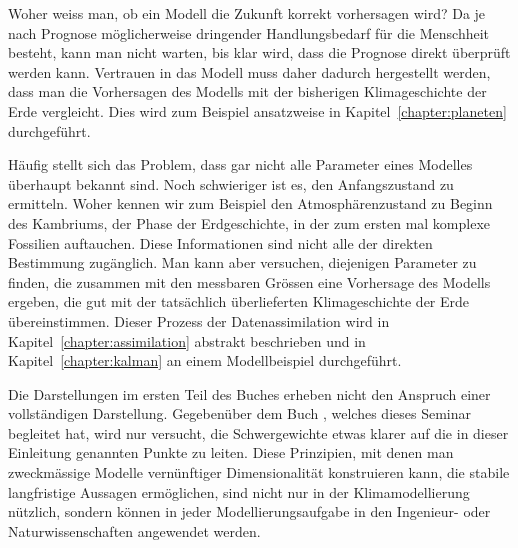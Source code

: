 Woher weiss man, ob ein Modell die Zukunft korrekt vorhersagen wird?
Da je nach Prognose möglicherweise dringender Handlungsbedarf für die
Menschheit besteht, kann man nicht warten, bis klar wird, dass die
Prognose direkt überprüft werden kann.
Vertrauen in das Modell muss daher dadurch hergestellt werden, dass
man die Vorhersagen des Modells mit der bisherigen Klimageschichte
der Erde vergleicht.
Dies wird zum Beispiel ansatzweise in Kapitel~\ref{chapter:planeten}
durchgeführt.

Häufig stellt sich das Problem, dass gar nicht alle Parameter eines
Modelles überhaupt bekannt sind.
Noch schwieriger ist es, den Anfangszustand zu ermitteln.
Woher kennen wir zum Beispiel den Atmosphärenzustand zu Beginn des
Kambriums, der Phase der Erdgeschichte, in der zum ersten mal komplexe
Fossilien auftauchen.
Diese Informationen sind nicht alle der direkten Bestimmung
zugänglich.
Man kann aber versuchen, diejenigen Parameter zu finden, die zusammen
mit den messbaren Grössen eine Vorhersage des Modells ergeben, die
gut mit der tatsächlich überlieferten Klimageschichte der Erde 
übereinstimmen.
Dieser Prozess der Datenassimilation wird in
Kapitel~\ref{chapter:assimilation} abstrakt beschrieben und in
Kapitel~\ref{chapter:kalman} an einem Modellbeispiel durchgeführt.

Die Darstellungen im ersten Teil des Buches erheben nicht den Anspruch
einer vollständigen Darstellung.
Gegebenüber dem Buch \cite{skript:kaperengler}, welches dieses Seminar
begleitet hat, wird nur versucht, die Schwergewichte etwas klarer auf
die in dieser Einleitung genannten Punkte zu leiten.
Diese Prinzipien, mit denen man zweckmässige Modelle vernünftiger
Dimensionalität konstruieren kann, die stabile langfristige
Aussagen ermöglichen, sind nicht nur in der Klimamodellierung
nützlich, sondern können in jeder Modellierungsaufgabe in den Ingenieur-
oder Naturwissenschaften angewendet werden.








